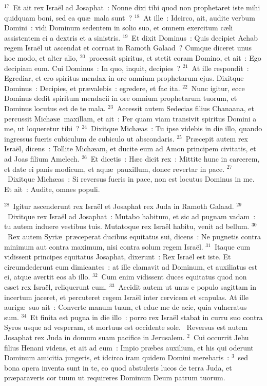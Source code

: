 ${}^{17}$~Et ait rex Isra\"el ad Josaphat~: Nonne dixi tibi quod non prophetaret iste mihi quidquam boni, sed ea qu\ae\ mala sunt~?
${}^{18}$~At ille~: Idcirco, ait, audite verbum Domini~: vidi Dominum sedentem in solio suo, et omnem exercitum c\ae li assistentem ei a dextris et a sinistris.
${}^{19}$~Et dixit Dominus~: Quis decipiet Achab regem Isra\"el ut ascendat et corruat in Ramoth Galaad~? Cumque diceret unus hoc modo, et alter alio,
${}^{20}$~processit spiritus, et stetit coram Domino, et ait~: Ego decipiam eum. Cui Dominus~: In quo, inquit, decipies~?
${}^{21}$~At ille respondit~: Egrediar, et ero spiritus mendax in ore omnium prophetarum ejus. Dixitque Dominus~: Decipies, et pr\ae valebis~: egredere, et fac ita.
${}^{22}$~Nunc igitur, ecce Dominus dedit spiritum mendacii in ore omnium prophetarum tuorum, et Dominus locutus est de te mala.
${}^{23}$~Accessit autem Sedecias filius Chanaana, et percussit Mich\ae \ae\ maxillam, et ait~: Per quam viam transivit spiritus Domini a me, ut loqueretur tibi~?
${}^{24}$~Dixitque Mich\ae as~: Tu ipse videbis in die illo, quando ingressus fueris cubiculum de cubiculo ut abscondaris.
${}^{25}$~Pr\ae cepit autem rex Isra\"el, dicens~: Tollite Mich\ae am, et ducite eum ad Amon principem civitatis, et ad Joas filium Amelech.
${}^{26}$~Et dicetis~: H\ae c dicit rex~: Mittite hunc in carcerem, et date ei panis modicum, et aqu\ae\ pauxillum, donec revertar in pace.
${}^{27}$~Dixitque Mich\ae as~: Si reversus fueris in pace, non est locutus Dominus in me. Et ait~: Audite, omnes populi.


${}^{28}$~Igitur ascenderunt rex Isra\"el et Josaphat rex Juda in Ramoth Galaad.
${}^{29}$~Dixitque rex Isra\"el ad Josaphat~: Mutabo habitum, et sic ad pugnam vadam~: tu autem induere vestibus tuis. Mutatoque rex Isra\"el habitu, venit ad bellum.
${}^{30}$~Rex autem Syri\ae\ pr\ae ceperat ducibus equitatus sui, dicens~: Ne pugnetis contra minimum aut contra maximum, nisi contra solum regem Isra\"el.
${}^{31}$~Itaque cum vidissent principes equitatus Josaphat, dixerunt~: Rex Isra\"el est iste. Et circumdederunt eum dimicantes~: at ille clamavit ad Dominum, et auxiliatus est ei, atque avertit eos ab illo.
${}^{32}$~Cum enim vidissent duces equitatus quod non esset rex Isra\"el, reliquerunt eum.
${}^{33}$~Accidit autem ut unus e populo sagittam in incertum jaceret, et percuteret regem Isra\"el inter cervicem et scapulas. At ille aurig\ae\ suo ait~: Converte manum tuam, et educ me de acie, quia vulneratus sum.
${}^{34}$~Et finita est pugna in die illo~: porro rex Isra\"el stabat in curru suo contra Syros usque ad vesperam, et mortuus est occidente sole.
~\lettrine[lines=10,image=true,loversize=0.05,lraise=-0.03]{R}{}eversus est autem Josaphat rex Juda in domum suam pacifice in Jerusalem.
${}^{2}$~Cui occurrit Jehu filius Henani videns, et ait ad eum~: Impio pr\ae bes auxilium, et his qui oderunt Dominum amicitia jungeris, et idcirco iram quidem Domini merebaris~:
${}^{3}$~sed bona opera inventa sunt in te, eo quod abstuleris lucos de terra Juda, et pr\ae paraveris cor tuum ut requireres Dominum Deum patrum tuorum.


